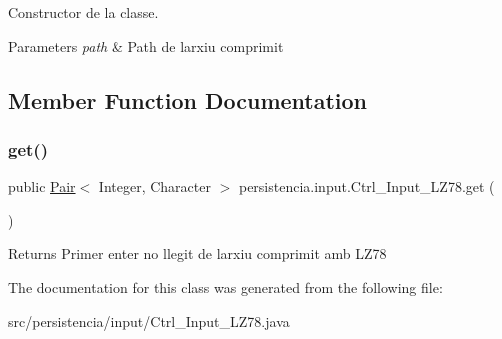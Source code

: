 Constructor de la classe. 


\begin{DoxyParams}{Parameters}
{\em path} & Path de l\textquotesingle{}arxiu comprimit \\
\hline
\end{DoxyParams}


\subsection{Member Function Documentation}
\mbox{\label{classpersistencia_1_1input_1_1Ctrl__Input__LZ78_ae09535962f284be3a76369845c15b78c}} 
\subsubsection{\texorpdfstring{get()}{get()}}
{\footnotesize\ttfamily public \hyperlink{classdomini_1_1utils_1_1Pair}{Pair}$<$ Integer, Character $>$ persistencia.\+input.\+Ctrl\+\_\+\+Input\+\_\+\+L\+Z78.\+get (\begin{DoxyParamCaption}{ }\end{DoxyParamCaption})\hspace{0.3cm}{\ttfamily [inline]}}

\begin{DoxyReturn}{Returns}
Primer enter no llegit de l\textquotesingle{}arxiu comprimit amb L\+Z78 
\end{DoxyReturn}


The documentation for this class was generated from the following file\+:\begin{DoxyCompactItemize}
\item 
src/persistencia/input/Ctrl\+\_\+\+Input\+\_\+\+L\+Z78.\+java\end{DoxyCompactItemize}
